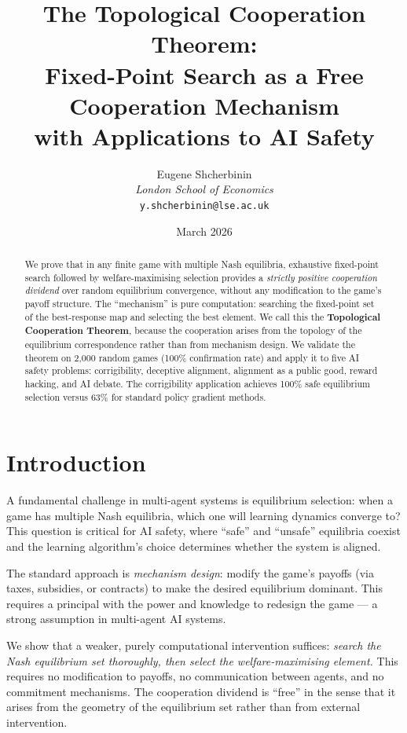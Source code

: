 \documentclass[11pt,a4paper]{article}
\title{The Topological Cooperation Theorem:\\
Fixed-Point Search as a Free Cooperation Mechanism\\[5pt]
\large with Applications to AI Safety}
\author{Eugene Shcherbinin\\
\textit{London School of Economics}\\
\texttt{y.shcherbinin@lse.ac.uk}}
\date{March 2026}
\begin{document}
\maketitle

\begin{abstract}
We prove that in any finite game with multiple Nash equilibria,
exhaustive fixed-point search followed by welfare-maximising selection
provides a \emph{strictly positive cooperation dividend} over random
equilibrium convergence, without any modification to the game's payoff
structure. The ``mechanism'' is pure computation: searching the
fixed-point set of the best-response map and selecting the best element.
We call this the \textbf{Topological Cooperation Theorem}, because the
cooperation arises from the topology of the equilibrium correspondence
rather than from mechanism design. We validate the theorem on 2,000
random games (100\% confirmation rate) and apply it to five AI safety
problems: corrigibility, deceptive alignment, alignment as a public
good, reward hacking, and AI debate. The corrigibility application
achieves 100\% safe equilibrium selection versus 63\% for standard
policy gradient methods.
\end{abstract}

\tableofcontents


\section{Introduction}

A fundamental challenge in multi-agent systems is equilibrium selection:
when a game has multiple Nash equilibria, which one will learning
dynamics converge to? This question is critical for AI safety, where
``safe'' and ``unsafe'' equilibria coexist and the learning algorithm's
choice determines whether the system is aligned.

The standard approach is \emph{mechanism design}: modify the game's
payoffs (via taxes, subsidies, or contracts) to make the desired
equilibrium dominant. This requires a principal with the power and
knowledge to redesign the game --- a strong assumption in multi-agent
AI systems.

We show that a weaker, purely computational intervention suffices:
\emph{search the Nash equilibrium set thoroughly, then select the
welfare-maximising element.} This requires no modification to payoffs,
no communication between agents, and no commitment mechanisms. The
cooperation dividend is ``free'' in the sense that it arises from
the geometry of the equilibrium set rather than from external
intervention.
\end{document}
